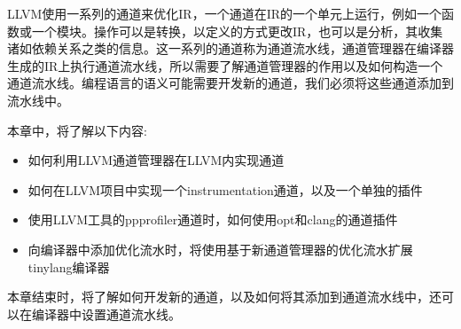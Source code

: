 
LLVM使用一系列的通道来优化IR，一个通道在IR的一个单元上运行，例如一个函数或一个模块。操作可以是转换，以定义的方式更改IR，也可以是分析，其收集诸如依赖关系之类的信息。这一系列的通道称为通道流水线，通道管理器在编译器生成的IR上执行通道流水线，所以需要了解通道管理器的作用以及如何构造一个通道流水线。编程语言的语义可能需要开发新的通道，我们必须将这些通道添加到流水线中。

本章中，将了解以下内容:

\begin{itemize}
\item
如何利用LLVM通道管理器在LLVM内实现通道

\item
如何在LLVM项目中实现一个instrumentation通道，以及一个单独的插件

\item
使用LLVM工具的ppprofiler通道时，如何使用opt和clang的通道插件

\item
向编译器中添加优化流水时，将使用基于新通道管理器的优化流水扩展tinylang编译器
\end{itemize}

本章结束时，将了解如何开发新的通道，以及如何将其添加到通道流水线中，还可以在编译器中设置通道流水线。